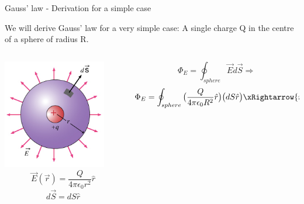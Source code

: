 \begin{frame}{Gauss' law - Derivation for a simple case}

We will derive Gauss' law for a very simple case: A single charge Q in the centre of a sphere of radius R.

\begin{columns}
  \begin{column}{0.34\textwidth}
   \begin{center}
    \includegraphics[width=0.85\textwidth]{./images/schematics/gauss_law_S.png}
    \begin{equation*}
        \vec{E}(\vec{r}) = \frac{Q}{4\pi\epsilon_0 r^{2}} \hat{r}
    \end{equation*}
    \begin{equation*}
        d\vec{S} = dS \hat{r}
    \end{equation*}
   \end{center}
  \end{column}
  \begin{column}{0.66\textwidth}
    \begin{equation*}
        \Phi_E = \oint_{sphere} \vec{E} d\vec{S} \Rightarrow
    \end{equation*}
    \begin{equation*}
        \Phi_E = \oint_{sphere} \big( \frac{Q}{4\pi\epsilon_0 R^{2}} \hat{r} \big) \big( dS \hat{r} \big) \xRightarrow {\hat{r}\cdot\hat{r}=1}

\end{equation*}
\end{column}
\end{columns}
\end{frame}

